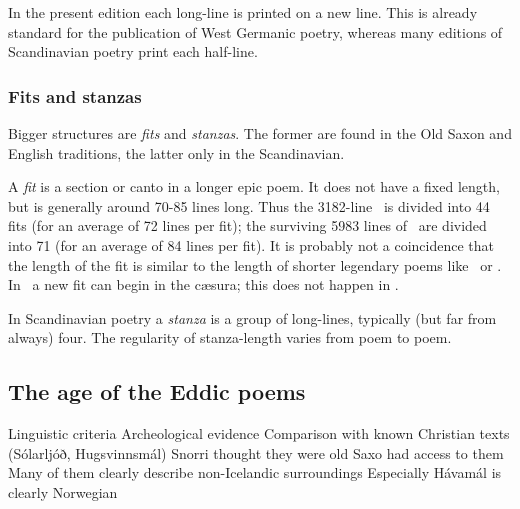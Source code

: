     In the present edition each long-line is printed on a new line.  This is already standard for the publication of West Germanic poetry, whereas many editions of Scandinavian poetry print each half-line.

    \subsubsection{Fits and stanzas}
    Bigger structures are \emph{fits} and \emph{stanzas}.  The former are found in the Old Saxon and English traditions, the latter only in the Scandinavian.

    A \emph{fit} is a section or canto in a longer epic poem.  It does not have a fixed length, but is generally around 70-85 lines long.  Thus the 3182-line \Beowulf\ is divided into 44 fits (for an average of 72 lines per fit); the surviving 5983 lines of \Heliand\ are divided into 71 (for an average of 84 lines per fit).  It is probably not a coincidence that the length of the fit is similar to the length of shorter legendary poems like \GudrunOne\ or \Hildebrandslied.  In \Heliand\ a new fit can begin in the cæsura; this does not happen in \Beowulf.

    In Scandinavian poetry a \emph{stanza} is a group of long-lines, typically (but far from always) four.  The regularity of stanza-length varies from poem to poem.


  \subsection{The age of the Eddic poems}%
    Linguistic criteria
    Archeological evidence
    Comparison with known Christian texts (Sólarljóð, Hugsvinnsmál)
    Snorri thought they were old
    Saxo had access to them
    Many of them clearly describe non-Icelandic surroundings
      Especially Hávamál is clearly Norwegian


